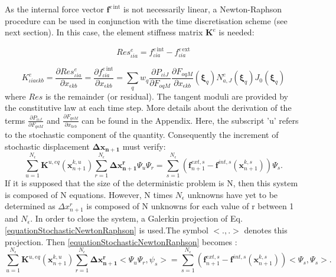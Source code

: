 \documentclass[oneside,11pt,times]{book}
\newcommand\omicron{o}
\begin{document}
As the internal force vector $\bm{f}^{e\,\text{int}}$ is not necessarily linear, a Newton-Raphson procedure can be used in conjunction with the time discretisation scheme (see next section). In this case, the element stiffness matrix $\bm{K}^e$ is needed:

\begin{equation}
\label{eq:ReseiaSt}
Res_{\iota i a}^e = f_{\iota i a}^{e\,\text{int}} - f_{\iota i a}^{e\,\text{ext}}
\end{equation}

\begin{equation}
\label{eq:KeiakbSt}
K_{\iota ia\epsilon kb}^e = \frac{\partial Res_{ \iota i a}^e}{\partial x_{ \epsilon k b}}= \frac{\partial f_{ \iota i a}^{e\,\text{int}}}{\partial x_{ \epsilon k b}}= \sum_q w_q  \frac{\partial P_{ \iota i J}}{\partial F_{ \omicron q M}} \frac{\partial F_{ \omicron q M}}{\partial x_{ \epsilon k b}}(\bm{\xi}_q) N^e_{a,J}(\bm{\xi}_q)  J_0(\bm{\xi}_q)
\end{equation}
where $Res$ is the remainder (or residual). The tangent moduli are provided by the constitutive law at each time step. More details about the derivation of the terms $\frac{\partial P_{i \iota J}}{\partial F_{q \omicron M}}$ and $\frac{\partial F_{q \omicron M}}{\partial x_{k \epsilon b}}$ can be found in the Appendix.
Here, the subscript 'u' refers to the stochastic component of the quantity. Consequently the increment of stochastic displacement $\bm{\Delta{x_{n+1}}}$ must verify:
\begin{equation}
\label{equationStochasticNewtonRaphson}
\sum\limits_{u=1}^{N_{\epsilon}} \bm{K}^{u,eq}(\bm{x}^{k,u}_{n+1}) \sum\limits_{r=1}^{N_{\epsilon}} \bm{\Delta{x^{r}_{n+1}}} \Psi_u \Psi_r= \sum\limits_{s=1}^{N_{\epsilon}} (\bm{f}^{ext,s}_{n+1} - \bm{f}^{int,s}(\bm{x}^{k,s}_{n+1})) \Psi_s.
\end{equation}
If it is supposed that the size of the deterministic problem is N, then this system is composed of N equations. However, N times $N_{\epsilon}$ unknowns have yet to be determined as $\Delta{x^{r}_{n+1}}$ is composed of N unknowns for each value of r between 1 and $N_{\epsilon}$. In order to close the system, a Galerkin projection of Eq. \eqref{equationStochasticNewtonRaphson} is used.The symbol $<.,.>$ denotes this projection. Then \eqref{equationStochasticNewtonRaphson} becomes :
\begin{equation}
\label{equationStochasticGalerkinNewtonRaphson}
\sum\limits_{u=1}^{N_{\epsilon}} \bm{K}^{u,eq}(\bm{x}^{k,u}_{n+1}) \sum\limits_{r=1}^{N_{\epsilon}} \bm{\Delta{x^{r}_{n+1}}} <\Psi_u\Psi_r, \psi_s> = \sum\limits_{s=1}^{N_{\epsilon}} (\bm{f}^{ext,s}_{n+1} - \bm{f}^{int,s}(\bm{x}^{k,s}_{n+1})) <\Psi_s,\Psi_s>.
\end{equation}
\end{document}
